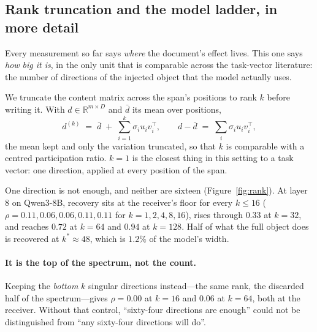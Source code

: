 \documentclass{article}
\newcommand{\dvec}{\ensuremath{d}}
\begin{document}
\subsection{Rank truncation and the model ladder, in more detail}
\label{app:rank2}

Every measurement so far says \emph{where} the document's effect lives. This one
says \emph{how big it is}, in the only unit that is comparable across the
task-vector literature: the number of directions of the injected object that the
model actually uses.

We truncate the content matrix across the span's positions to rank $k$ before
writing it. With $\dvec \in \mathbb{R}^{m \times D}$ and $\bar{\dvec}$ its mean
over positions,
\begin{equation}
\dvec^{(k)} \;=\; \bar{\dvec} \;+\; \sum_{i=1}^{k} \sigma_i u_i v_i^{\top},
\qquad
\dvec - \bar{\dvec} \;=\; \textstyle\sum_i \sigma_i u_i v_i^{\top},
\end{equation}
the mean kept and only the variation truncated, so that $k$ is comparable with a
centred participation ratio. $k=1$ is the closest thing in this setting to a
task vector: one direction, applied at every position of the span.

One direction is not enough, and neither are sixteen
(Figure~\ref{fig:rank}). At layer $8$ on Qwen3-8B, recovery sits at the
receiver's floor for every $k \le 16$ ($\rho = 0.11, 0.06, 0.06, 0.11, 0.11$ for
$k = 1,2,4,8,16$), rises through $0.33$ at $k=32$, and reaches $0.72$ at $k=64$
and $0.94$ at $k=128$. Half of what the full object does is recovered at
$k^{*}\approx 48$, which is $1.2\%$ of the model's width.

\paragraph{It is the top of the spectrum, not the count.} Keeping the
\emph{bottom} $k$ singular directions instead---the same rank, the discarded
half of the spectrum---gives $\rho = 0.00$ at $k=16$ and $0.06$ at $k=64$, both
at the receiver. Without that control, ``sixty-four directions are enough''
could not be distinguished from ``any sixty-four directions will do''.
\end{document}
